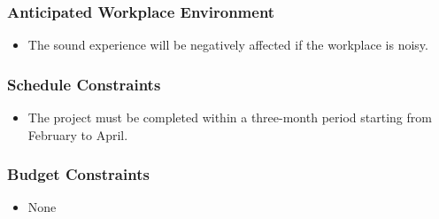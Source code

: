 \documentclass[12pt, titlepage]{article}
\begin{document}
\subsubsection{Anticipated Workplace Environment}
\begin{itemize}
        \item The sound experience will be negatively affected if the workplace is noisy.
\end{itemize}
\subsubsection{Schedule Constraints}
\begin{itemize}
        \item The project must be completed within a three-month period starting from February to April.
\end{itemize}
\subsubsection{Budget Constraints}
\begin{itemize}
        \item None
\end{itemize}
\end{document}
